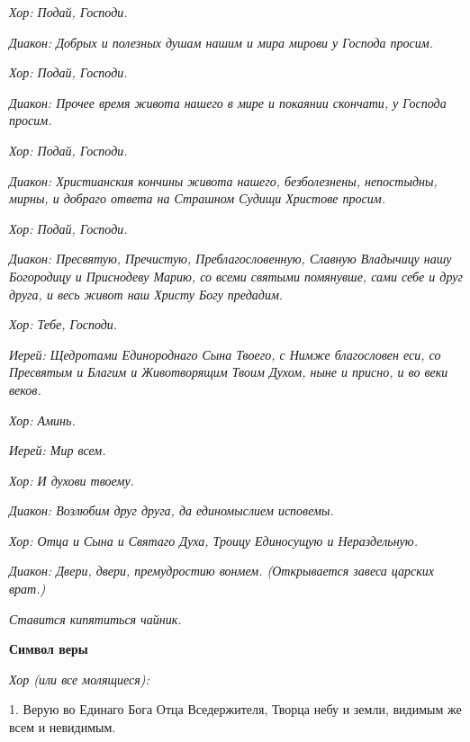  \itshape Хор:\normalfont{} Подай, Господи.


 \itshape Диакон:\normalfont{} Добрых и полезных душам нашим и мира мирови у Господа
просим.


 \itshape Хор:\normalfont{} Подай, Господи.


 \itshape Диакон:\normalfont{} Прочее время живота нашего в мире и покаянии скончати, у
Господа просим.


 \itshape Хор:\normalfont{} Подай, Господи.


 \itshape Диакон:\normalfont{} Христианския кончины живота нашего, безболезнены,
непостыдны, мирны, и добраго ответа на Страшном Судищи Христове
просим.


 \itshape Хор:\normalfont{} Подай, Господи.


 \itshape Диакон:\normalfont{} Пресвятую, Пречистую, Преблагословенную, Славную
Владычицу нашу Богородицу и Приснодеву Марию, со всеми святыми
помянувше, сами себе и друг друга, и весь живот наш Христу Богу
предадим.


 \itshape Хор:\normalfont{} Тебе, Господи.


 \itshape Иерей:\normalfont{} Щедротами Единороднаго Сына Твоего, с Нимже благословен еси,
со Пресвятым и Благим и Животворящим Твоим Духом, ныне и присно, и во
веки веков.


 \itshape Хор:\normalfont{} Аминь.


 \itshape Иерей:\normalfont{} Мир всем.


 \itshape Хор:\normalfont{} И духови твоему.


 \itshape Диакон:\normalfont{} Возлюбим друг друга, да единомыслием исповемы.


 \itshape Хор:\normalfont{} Отца и Сына и Святаго Духа, Троицу Единосущую и Нераздельную.


 \itshape Диакон:\normalfont{} Двери, двери, премудростию вонмем. \itshape (Открывается завеса
царских врат.)\normalfont{}


 \itshape Ставится кипятиться чайник.\normalfont{}



 

\bfseries  Символ веры\normalfont{}


 \itshape Хор (или все молящиеся):\normalfont{}



1. Верую во Единаго Бога Отца Вседержителя, Творца небу и земли,
     видимым же всем и невидимым.
     


